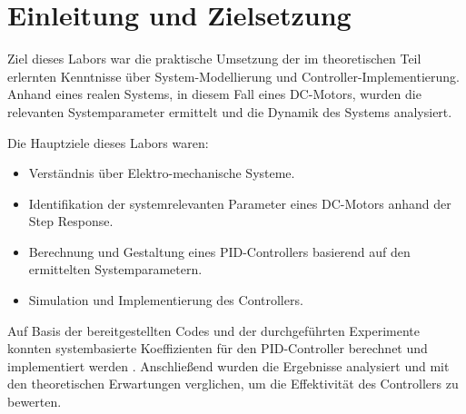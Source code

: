 \section{Einleitung und Zielsetzung}

Ziel dieses Labors war die praktische Umsetzung der im theoretischen Teil erlernten Kenntnisse über System-Modellierung und Controller-Implementierung. Anhand eines realen Systems, in diesem Fall eines DC-Motors, wurden die relevanten Systemparameter ermittelt und die Dynamik des Systems analysiert.

\vspace{0.8cm}

Die Hauptziele dieses Labors waren:
\begin{itemize}
    \item Verständnis über Elektro-mechanische Systeme.
    \item Identifikation der systemrelevanten Parameter eines DC-Motors anhand der Step Response.
    \item Berechnung und Gestaltung eines PID-Controllers basierend auf den ermittelten Systemparametern.
    \item Simulation und Implementierung des Controllers.
\end{itemize}

\vspace{0.8cm}

Auf Basis der bereitgestellten Codes und der durchgeführten Experimente konnten systembasierte Koeffizienten für den PID-Controller berechnet und implementiert werden \cite{labinstruction2026}. Anschließend wurden die Ergebnisse analysiert und mit den theoretischen Erwartungen verglichen, um die Effektivität des Controllers zu bewerten.